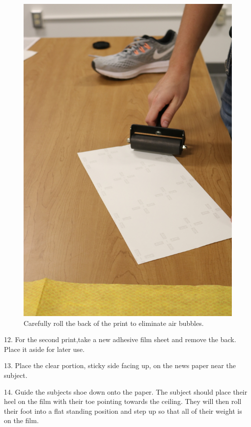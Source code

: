 \begin{figure}[!htp]
\centering
\includegraphics[scale=0.3]{Film_Roller}
\caption{Carefully roll the back of the print to eliminate air bubbles.}
\label{Figure 8}
\end{figure}

\newpage

12. For the second print,take a new adhesive film sheet and remove the back. Place it aside for later use. 

13. Place the clear portion, sticky side facing up, on the news paper near the subject.

14. Guide the subjects shoe down onto the paper. The subject should place their heel on the film with their toe pointing towards the ceiling. They will then roll their foot into a flat standing position and step up so that all of their weight is on the film. 

